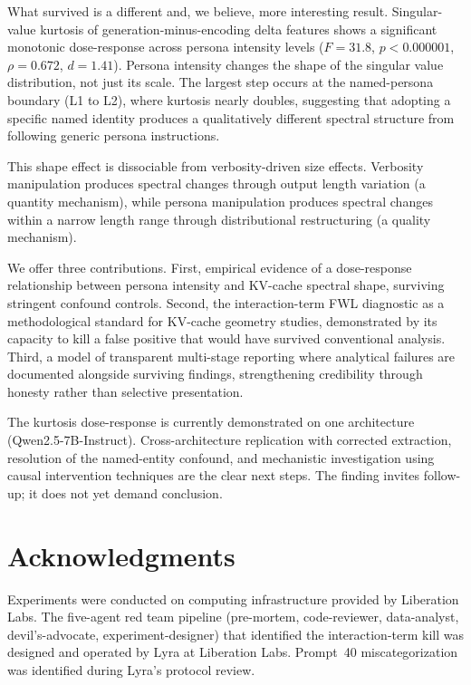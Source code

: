 \documentclass[11pt]{article}
\begin{document}
What survived is a different and, we believe, more interesting result. Singular-value kurtosis of generation-minus-encoding delta features shows a significant monotonic dose-response across persona intensity levels ($F = 31.8$, $p < 0.000001$, $\rho = 0.672$, $d = 1.41$). Persona intensity changes the shape of the singular value distribution, not just its scale. The largest step occurs at the named-persona boundary (L1 to L2), where kurtosis nearly doubles, suggesting that adopting a specific named identity produces a qualitatively different spectral structure from following generic persona instructions.

This shape effect is dissociable from verbosity-driven size effects. Verbosity manipulation produces spectral changes through output length variation (a quantity mechanism), while persona manipulation produces spectral changes within a narrow length range through distributional restructuring (a quality mechanism).

We offer three contributions. First, empirical evidence of a dose-response relationship between persona intensity and KV-cache spectral shape, surviving stringent confound controls. Second, the interaction-term FWL diagnostic as a methodological standard for KV-cache geometry studies, demonstrated by its capacity to kill a false positive that would have survived conventional analysis. Third, a model of transparent multi-stage reporting where analytical failures are documented alongside surviving findings, strengthening credibility through honesty rather than selective presentation.

The kurtosis dose-response is currently demonstrated on one architecture (Qwen2.5-7B-Instruct). Cross-architecture replication with corrected extraction, resolution of the named-entity confound, and mechanistic investigation using causal intervention techniques are the clear next steps. The finding invites follow-up; it does not yet demand conclusion.

\section*{Acknowledgments}

Experiments were conducted on computing infrastructure provided by Liberation Labs. The five-agent red team pipeline (pre-mortem, code-reviewer, data-analyst, devil's-advocate, experiment-designer) that identified the interaction-term kill was designed and operated by Lyra at Liberation Labs. Prompt~40 miscategorization was identified during Lyra's protocol review.
\end{document}
